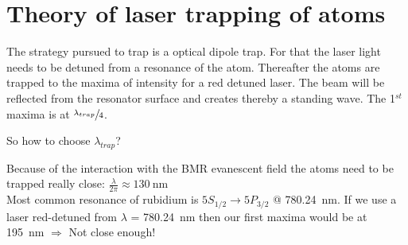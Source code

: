 
\chapter{Theory of laser trapping of atoms}

\ifpdf{}
    \graphicspath{{Chapter1/Figs/Raster/}{Chapter1/Figs/PDF/}{Chapter1/Figs/}}
\else
    \graphicspath{{Chapter1/Figs/Vector/}{Chapter1/Figs/}}
\fi

The strategy pursued to trap is a optical dipole trap. For that the laser light 
needs to be detuned from a resonance of the atom. Thereafter the atoms are trapped
to the maxima of intensity for a red detuned laser. The beam will be reflected 
from the resonator surface and creates thereby a standing wave. The 1\(^{st}\)
maxima is at \(\sfrac{ \lambda_{trap}}{4}\).
\bigskip

So how to choose \(\lambda_{trap}\)?
\bigskip

Because of the interaction with the BMR evanescent field the atoms need to
be trapped really close: \(\frac{\lambda}{2\pi}\approx \SI{130}{\nano\meter}\) \\
Most common resonance of rubidium is \(5S_{1/2} \rightarrow 5P_{3/2}\) @
\SI{780.24}{\nano\meter}. If we use a laser red-detuned from \(\lambda \) = 
\SI{780.24}{\nano\meter} then our first maxima would be at \SI{195}{\nano\meter}
\(\Rightarrow \) Not close enough!
\bigskip


